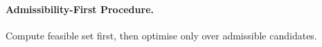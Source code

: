 \paragraph{Admissibility-First Procedure.} Compute feasible set first, then optimise only over admissible candidates.\n